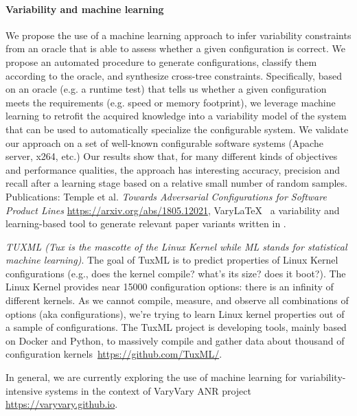 \paragraph{Variability and machine learning}
We propose the use of a machine learning approach to infer variability constraints
from an oracle that is able to assess whether a given configuration is correct.
We propose an automated procedure to generate configurations, classify them according to the oracle, and synthesize cross-tree constraints. Specifically, based on an oracle (e.g. a runtime test) that tells us whether a given configuration meets the requirements (e.g. speed or memory footprint), we leverage machine learning to retrofit the acquired knowledge into a variability model of the system that can be used to automatically specialize the configurable system. We validate our approach on a set of well-known configurable software systems (Apache server, x264, etc.) 
Our results show that, for many different kinds of objectives and performance qualities, the approach has interesting accuracy, precision and recall after a learning stage based on a relative small number of random samples.
Publications: Temple et al. \emph{Towards Adversarial Configurations for Software Product Lines} \url{https://arxiv.org/abs/1805.12021}, VaryLaTeX~\cite{acher:hal-01659161} a variability and learning-based tool to generate relevant paper variants written in \latex. 

\emph{TUXML (Tux is the mascotte of the Linux Kernel while ML stands for statistical machine learning)}. The goal of TuxML  is to predict properties of Linux Kernel configurations (e.g., does the kernel compile? what's its size? does it boot?). The Linux Kernel provides near 15000 configuration options: there is an infinity of different kernels. As we cannot compile, measure, and observe all combinations of options (aka configurations), we're trying to learn Linux kernel properties out of a sample of configurations. The TuxML project is developing tools, mainly based on Docker and Python, to massively compile and gather data about thousand of configuration kernels~\url{https://github.com/TuxML/}.

In general, we are currently exploring the use of machine learning for variability-intensive systems in the context of VaryVary ANR project \url{https://varyvary.github.io}.



